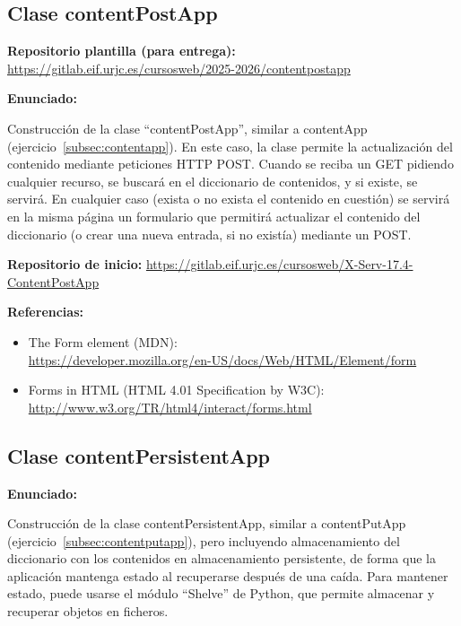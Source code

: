 \subsection{Clase contentPostApp}
\label{subsec:contentpostapp}

\textbf{Repositorio plantilla (para entrega):} \\
\url{https://gitlab.eif.urjc.es/cursosweb/2025-2026/contentpostapp}

\textbf{Enunciado:}

Construcción de la clase ``contentPostApp'', similar a contentApp (ejercicio~\ref{subsec:contentapp}). En este caso, la clase permite la actualización del contenido mediante peticiones HTTP POST. Cuando se reciba un GET pidiendo cualquier recurso, se buscará en el diccionario de contenidos, y si existe, se servirá. En cualquier caso (exista o no exista el contenido en cuestión) se servirá en la misma página un formulario que permitirá actualizar el contenido del diccionario (o crear una nueva entrada, si no existía) mediante un POST.

\textbf{Repositorio de inicio:} \url{https://gitlab.eif.urjc.es/cursosweb/X-Serv-17.4-ContentPostApp}

\textbf{Referencias:}

\begin{itemize}
\item The Form element (MDN): \\
  \url{https://developer.mozilla.org/en-US/docs/Web/HTML/Element/form}
\item Forms in HTML (HTML 4.01 Specification by W3C): \\
\url{http://www.w3.org/TR/html4/interact/forms.html}
\end{itemize}

\subsection{Clase contentPersistentApp}
\label{subsec:contentpersistentapp}

\textbf{Enunciado:}

Construcción de la clase contentPersistentApp, similar a contentPutApp (ejercicio~\ref{subsec:contentputapp}), pero incluyendo almacenamiento del diccionario con los contenidos en almacenamiento persistente, de forma que la aplicación mantenga estado al recuperarse después de una caída. Para mantener estado, puede usarse el módulo ``Shelve'' de Python, que permite almacenar y recuperar objetos en ficheros.

